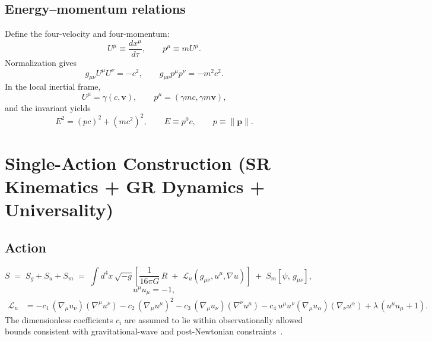 \documentclass[11pt]{article}
\begin{document}
        \subsection{Energy--momentum relations}
            Define the four-velocity and four-momentum:
            \begin{equation}
                U^\mu \equiv \frac{dx^\mu}{d\tau},
                \qquad
                p^\mu \equiv m U^\mu.
            \end{equation}
            Normalization gives
            \begin{equation}
                g_{\mu\nu}U^\mu U^\nu = -c^2,
                \qquad
                g_{\mu\nu}p^\mu p^\nu = -m^2 c^2.
            \end{equation}
            In the local inertial frame,
            \begin{equation}
                U^\mu = \gamma (c,\mathbf{v}),
                \qquad
                p^\mu = (\gamma m c,\gamma m \mathbf{v}),
            \end{equation}
            and the invariant yields
            \begin{equation}
                E^2 = (pc)^2 + (mc^2)^2,
                \qquad
                E \equiv p^0 c,
                \qquad
                p \equiv \lVert \mathbf{p}\rVert.
            \end{equation}


    \section{Single-Action Construction (SR Kinematics + GR Dynamics + Universality)}
        \label{sec:single-action}

        \subsection{Action}
            \begin{equation}
                S \;=\; S_g + S_u + S_m
                \;=\;\int d^4x\,\sqrt{-g}\left[\frac{1}{16\pi G}\,R \;+\; \mathcal{L}_u(g_{\mu\nu},u^\mu,\nabla u)\right]
                \;+\; S_m[\psi,\, g_{\mu\nu}],
            \end{equation}
            \begin{equation}
                u^\mu u_\mu = -1,
            \end{equation}
            \begin{align}
                \mathcal{L}_u
                &= -c_1 \,(\nabla_\mu u_\nu)(\nabla^\mu u^\nu)
                -c_2 \,(\nabla_\mu u^\mu)^2
                -c_3 \,(\nabla_\mu u_\nu)(\nabla^\nu u^\mu)
                -c_4 \,u^\mu u^\nu (\nabla_\mu u_\alpha)(\nabla_\nu u^\alpha)
                + \lambda\,(u^\mu u_\mu+1).
            \end{align}
            The dimensionless coefficients $c_i$ are assumed to lie within observationally
            allowed bounds consistent with gravitational-wave and post-Newtonian
            constraints~\cite{jacobson2008}.
\end{document}
